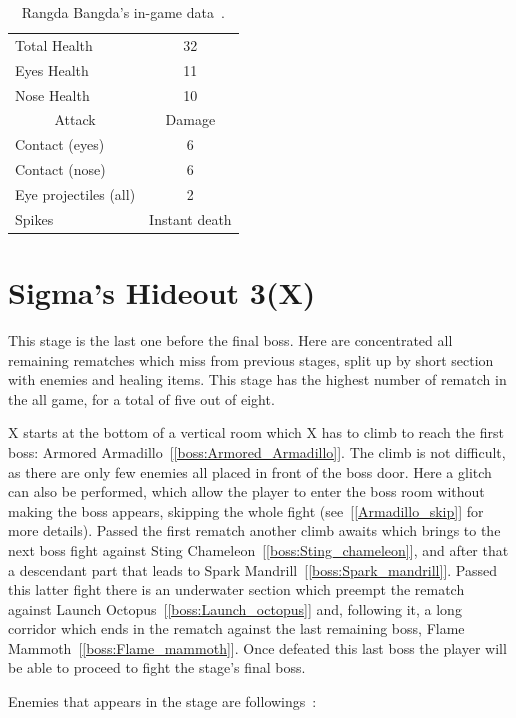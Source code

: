 \begin{table}
	\centering
	\begin{tabular}[h]{l c}
		\toprule
		Total Health  & 32\\
		Eyes Health & 11\\
		Nose Health & 10\\
		\midrule
		\multicolumn{1}{c}{Attack} & \multicolumn{1}{c}{Damage}\\
		Contact (eyes) & 6\\
		Contact (nose) & 6\\
		Eye projectiles (all) & 2\\
		Spikes & Instant death\\
		\bottomrule
	\end{tabular}
	\caption{Rangda Bangda's in-game data~\cite{wiki:Rangda_bangda}. }
\end{table}

\section{Sigma's Hideout 3(X)}
This stage is the last one before the final boss. Here are concentrated all remaining rematches which miss from previous stages, split up by short section with enemies and healing items. This stage has the highest number of rematch in the all game, for a total of five out of eight.

X starts at the bottom of a vertical room which X has to climb to reach the first boss: Armored Armadillo~[\ref{boss:Armored_Armadillo}]. The climb is not difficult, as there are only few enemies all placed in front of the boss door. Here a glitch can also be performed, which allow the player to enter the boss room without making the boss appears, skipping the whole fight (see~[\ref{Armadillo_skip}] for more details). Passed the first rematch another climb awaits which brings to the next boss fight against Sting Chameleon~[\ref{boss:Sting_chameleon}], and after that a descendant part that leads to Spark Mandrill~[\ref{boss:Spark_mandrill}]. Passed this latter fight there is an underwater section which preempt the rematch against Launch Octopus~[\ref{boss:Launch_octopus}] and, following it, a long corridor which ends in the rematch against the last remaining boss, Flame Mammoth~[\ref{boss:Flame_mammoth}]. Once defeated this last boss the player will be able to proceed to fight the stage's final boss.

Enemies that appears in the stage are followings~\cite{wiki:sigma_stages}:


